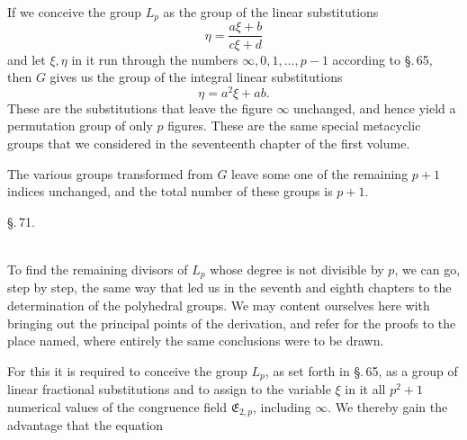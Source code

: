 If we conceive the group $L_p$ as the group of the linear substitutions
\[
\eta = \frac{a\xi+b}{c\xi+d}
\]
and let $\xi, \eta$ in it run through the numbers $\infty, 0, 1, \ldots, p-1$ according to \S.\,65, then $G$ gives us the group of the integral linear substitutions
\[
\eta = a^2\xi + ab.
\]
These are the substitutions that leave the figure $\infty$ unchanged, and hence yield a permutation group of only $p$ figures. These are the same special metacyclic groups that we considered in the seventeenth chapter of the first volume.

The various groups transformed from $G$ leave some one of the remaining $p+1$ indices unchanged, and the total number of these groups is $p+1$.

\begin{center}
\S.\,71.\\
\\
\end{center}

To find the remaining divisors of $L_p$ whose degree is not divisible by $p$, we can go, step by step, the same way that led us in the seventh and eighth chapters to the determination of the polyhedral groups. We may content ourselves here with bringing out the principal points of the derivation, and refer for the proofs to the place named, where entirely the same conclusions were to be drawn.

For this it is required to conceive the group $L_p$, as set forth in \S.\,65, as a group of linear fractional substitutions
and to assign to the variable $\xi$ in it all $p^2+1$ numerical values of the congruence field $\mathfrak{E}_{2,p}$, including $\infty$. We thereby gain the advantage that the equation
